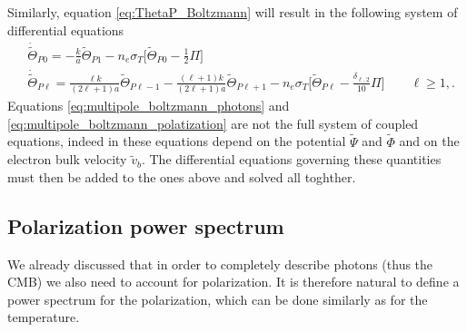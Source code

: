 Similarly, equation \eqref{eq:ThetaP_Boltzmann} will result in the following system of differential equations
\begin{subequations}\label{eq:multipole_boltzmann_polatization}
    \begin{align}
           &\dot{\tilde{\Theta}}_{P0}=-\frac{k}{a}\tilde{\Theta}_{P1}-n_e\sigma_T\bigg[\tilde\Theta_{P0}-\frac{1}{2}\Pi\bigg]\label{eq:multipole_boltzmann_polatization_0}\\
            &\dot{\tilde{\Theta}}_{P\ell}=\frac{\ell k}{(2\ell+1)a}\tilde\Theta_{P\ell-1}-\frac{(\ell+1)k}{(2\ell+1)a}\tilde\Theta_{P\ell+1}-n_e\sigma_T\bigg[\tilde\Theta_{P\ell}-\frac{\delta_{\ell,2}}{10}\Pi\bigg]\qquad \ell\geq 1,\label{eq:multipole_boltzmann_polatization_2}.
        \end{align}
\end{subequations}  
Equations \eqref{eq:multipole_boltzmann_photons} and \eqref{eq:multipole_boltzmann_polatization} are not the full system of coupled equations, indeed in these equations depend on the potential $\tilde\Psi$ and $\tilde\Phi$ and on the electron bulk velocity $\tilde v_b$. The differential equations governing these quantities must then be added to the ones above and solved all toghther.
\subsection{Polarization power spectrum}\label{sec:PolarizationPowerSpectrum}
We already discussed that in order to completely describe photons (thus the CMB) we also need to account for polarization. It is therefore natural to define a power spectrum for the polarization, which can be done similarly as for the temperature.

